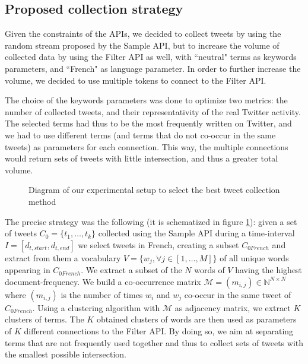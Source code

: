 			\subsection{Proposed collection strategy \label{Subsec: collection strategy}}

Given the constraints of the APIs, we decided to collect tweets by using the random stream proposed by the Sample API, but to increase the volume of collected data by using the Filter API as well, with ``neutral" terms as keywords parameters, and ``French" as language parameter.  In order to further increase the volume, we decided to use multiple tokens to connect to the Filter API. 



The choice of the keywords parameters was done to optimize two metrics: the number of collected tweets, and their representativity of the real Twitter activity. The selected terms had thus to be the most frequently written on Twitter, and we had to use different terms (and terms that do not co-occur in the same tweets) as parameters for each connection. This way, the multiple connections would return sets of tweets with little intersection, and thus a greater total volume.


\begin{figure}
\caption{Diagram of our experimental setup to select the best tweet collection method}
\label{Figure:ExperimentalSetup}
\end{figure}

The precise strategy was the following (it is schematized in figure \ref{Figure:ExperimentalSetup}): given a set of tweets $C_{0}=\{t_{1},\ldots, t_{k}\}$  collected using the Sample API during a time-interval $I = [d_{t,start}, d_{t,end}]$ we select tweets in French, creating a subset $C_{0 French}$ and extract from them a vocabulary $V = \{w_j, \forall j\in[1, \ldots,M]\}$ of all unique words appearing in $C_{0 French}$. We extract a subset of the $N$ words of $V$ having the highest document-frequency. We build a co-occurrence matrix $\mathcal{M} = (m_{i,j}) \in \mathbb{N}^{N\times N}$ where $(m_{i,j})$ is the number of times $w_i$ and $w_j$ co-occur in the same tweet of $C_{0 French}$. Using a clustering algorithm with $\mathcal{M}$ as adjacency matrix, we extract  $K$ clusters of terms. The $K$ obtained clusters of words are then used as parameters of $K$ different connections to the Filter API. By doing so, we aim at separating terms that are not frequently used together and thus to collect sets of tweets with the smallest possible intersection.


